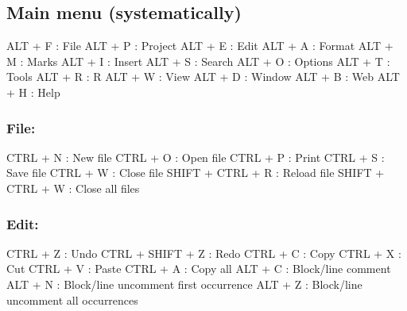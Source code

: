 \newpage
\hypertarget{basic_card_mainmenu}{}
\subsection{Main menu (systematically)}

\vspace{-0.5cm}
\begin{Rtables}[caption={[Main menu keyboard shortcuts]
    Main Menu keyboard shortcuts},
  label=menu:main]
  ALT + F                 : File
  ALT + P                 : Project
  ALT + E                 : Edit
  ALT + A                 : Format
  ALT + M                 : Marks
  ALT + I                 : Insert
  ALT + S                 : Search
  ALT + O                 : Options
  ALT + T                 : Tools
  ALT + R                 : R
  ALT + W                 : View
  ALT + D                 : Window
  ALT + B                 : Web
  ALT + H                 : Help
\end{Rtables}


\subsubsection{File:}

\vspace{-0.5cm}
\begin{Rtables}[caption={[File menu keyboard shortcuts]
    File menu keyboard shortcuts},
  label=menu:file]
  CTRL  + N               : New file
  CTRL  + O               : Open file
  CTRL  + P               : Print
  CTRL  + S               : Save file
  CTRL  + W               : Close file
  SHIFT + CTRL + R        : Reload file
  SHIFT + CTRL + W        : Close all files
\end{Rtables}


\subsubsection{Edit:}

\vspace{-0.5cm}
\begin{Rtables}[caption={[Edit menu keyboard shortcuts]
    Edit menu keyboard shortcuts},
  label=menu:edit]
  CTRL + Z                : Undo
  CTRL + SHIFT + Z        : Redo
  CTRL + C                : Copy
  CTRL + X                : Cut
  CTRL + V                : Paste
  CTRL + A                : Copy all
  ALT  + C                : Block/line comment
  ALT  + N                : Block/line uncomment first occurrence
  ALT  + Z                : Block/line uncomment all occurrences
\end{Rtables}



